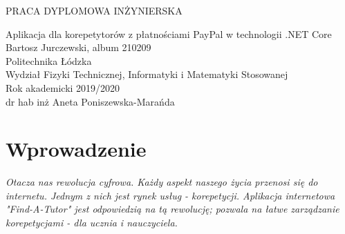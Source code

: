 \documentclass[12pt]{article}
\numberwithin{figure}{section}
\begin{document}
\begin{titlepage}
 \thispagestyle{empty}
 \begin{center}
  \vspace{3cm}
  \large
    PRACA DYPLOMOWA INŻYNIERSKA\\
  \vspace{5cm}

  \Huge
    Aplikacja dla korepetytorów z płatnościami PayPal w technologii .NET Core\\
  \large
  \vspace{2cm}
  Bartosz Jurczewski, album 210209\\
  \bigbreak
  Politechnika Łódzka\\
  Wydział Fizyki Technicznej, Informatyki i Matematyki Stosowanej\\
  Rok akademicki 2019/2020\\
  \bigbreak
   dr hab inż Aneta Poniszewska-Marańda \\
 \end{center}
\end{titlepage}

\clearpage
{}
\setcounter{page}{1}
\setcounter{secnumdepth}{3}

\tableofcontents
\pagebreak

\pagebreak
\section{Wprowadzenie}
\textit{Otacza nas rewolucja cyfrowa. Każdy aspekt naszego życia przenosi się do internetu. Jednym z nich jest rynek usług - korepetycji. Aplikacja internetowa "Find-A-Tutor" jest odpowiedzią na tą rewolucję; pozwala na łatwe zarządzanie korepetycjami - dla ucznia i nauczyciela.}

\end{document}
